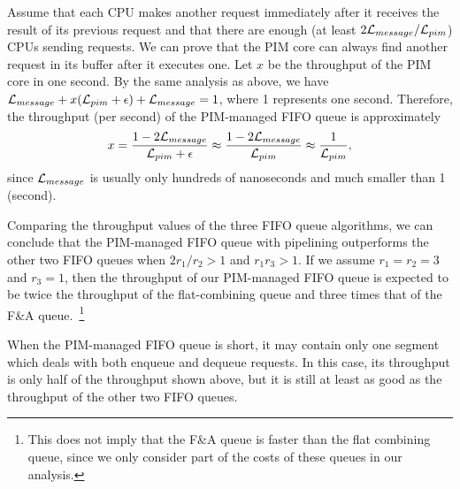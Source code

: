 Assume that each CPU makes another request immediately after it receives the result of its previous request 
and that there are enough (at least $2\mathcal{L}_{message} / \mathcal{L}_{pim}$) CPUs sending requests.
We can prove that the PIM core can always find another request in its buffer after it executes one. 
Let $x$ be the throughput of the PIM core in one second.
By the same analysis as above, we have $\mathcal{L}_{message} + x(\mathcal{L}_{pim} + \epsilon) + \mathcal{L}_{message} = 1$,  
where 1 represents one second.
Therefore, the throughput (per second) of the PIM-managed FIFO queue is approximately 
$$x = {1 - 2\mathcal{L}_{message} \over \mathcal{L}_{pim} + \epsilon} \approx {1 - 2\mathcal{L}_{message}\over \mathcal{L}_{pim}} 
\approx {1 \over \mathcal{L}_{pim}},$$
since $\mathcal{L}_{message}$ is usually only hundreds of nanoseconds and much smaller than 1 (second). 

Comparing the throughput values of the three FIFO queue algorithms, 
we can conclude that the PIM-managed FIFO queue with pipelining outperforms the other two FIFO queues 
when $2r_1 / r_2 > 1$ and $r_1 r_3 > 1$. 
If we assume $r_1 = r_2 = 3$ and $r_3 = 1$, then the throughput of our PIM-managed FIFO queue is expected to be 
twice the throughput of the flat-combining queue and three times that
of the F\&A queue.~\footnote{This does not imply that the F\&A queue is faster than the flat combining queue, 
since we only consider part of the costs of these queues in our analysis.}

When the PIM-managed FIFO queue is short, it may contain only one segment 
which deals with both enqueue and dequeue requests. 
In this case, its throughput is only half of the throughput shown above, 
but it is still at least as good as the throughput of the other two FIFO queues. 

